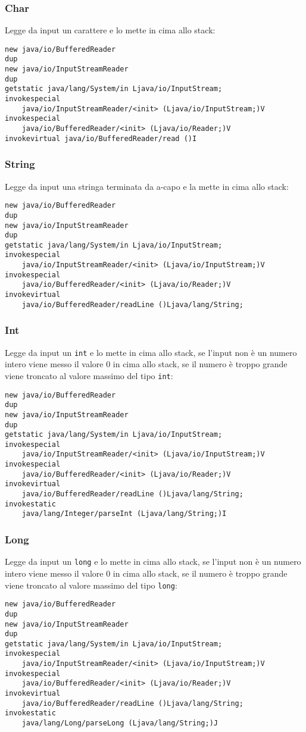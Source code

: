 \subsubsection*{Char}
Legge da input un carattere e lo mette in cima allo stack:
\begin{verbatim}
new java/io/BufferedReader
dup
new java/io/InputStreamReader
dup
getstatic java/lang/System/in Ljava/io/InputStream;
invokespecial
    java/io/InputStreamReader/<init> (Ljava/io/InputStream;)V
invokespecial
    java/io/BufferedReader/<init> (Ljava/io/Reader;)V
invokevirtual java/io/BufferedReader/read ()I
\end{verbatim}

\subsubsection*{String}
Legge da input una stringa terminata da a-capo e la mette in cima allo stack:
\begin{verbatim}
new java/io/BufferedReader
dup
new java/io/InputStreamReader
dup
getstatic java/lang/System/in Ljava/io/InputStream;
invokespecial
    java/io/InputStreamReader/<init> (Ljava/io/InputStream;)V
invokespecial
    java/io/BufferedReader/<init> (Ljava/io/Reader;)V
invokevirtual
    java/io/BufferedReader/readLine ()Ljava/lang/String;
\end{verbatim}

\subsubsection*{Int}
Legge da input un \texttt{int} e lo mette in cima allo stack, se l'input non \`e un numero intero viene messo il valore 0 in cima allo stack, se il numero \`e troppo grande viene troncato al valore massimo del tipo \texttt{int}:
\begin{verbatim}
new java/io/BufferedReader
dup
new java/io/InputStreamReader
dup
getstatic java/lang/System/in Ljava/io/InputStream;
invokespecial
    java/io/InputStreamReader/<init> (Ljava/io/InputStream;)V
invokespecial
    java/io/BufferedReader/<init> (Ljava/io/Reader;)V
invokevirtual
    java/io/BufferedReader/readLine ()Ljava/lang/String;
invokestatic
    java/lang/Integer/parseInt (Ljava/lang/String;)I
\end{verbatim}

\subsubsection*{Long}
Legge da input un \texttt{long} e lo mette in cima allo stack, se l'input non \`e un numero intero viene messo il valore 0 in cima allo stack, se il numero \`e troppo grande viene troncato al valore massimo del tipo \texttt{long}:
\begin{verbatim}
new java/io/BufferedReader
dup
new java/io/InputStreamReader
dup
getstatic java/lang/System/in Ljava/io/InputStream;
invokespecial
    java/io/InputStreamReader/<init> (Ljava/io/InputStream;)V
invokespecial
    java/io/BufferedReader/<init> (Ljava/io/Reader;)V
invokevirtual
    java/io/BufferedReader/readLine ()Ljava/lang/String;
invokestatic
    java/lang/Long/parseLong (Ljava/lang/String;)J
\end{verbatim}

